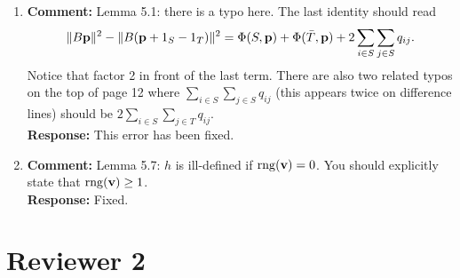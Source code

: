 \documentclass[a4paper,10pt]{article}
\begin{document}
\begin{enumerate}
\item\textbf{Comment:} 
Lemma 5.1: there is a typo here.  The last identity should read
\[
\|B\mathbf{p}\|^2 - \|B(\mathbf{p} + 1_S - 1_T)\|^2 = \Phi(S,\mathbf{p}) + \Phi(\bar{T}, \mathbf{p}) + 2\sum_{i \in S}\sum_{j\in S} q_{ij}.
\]
Notice that factor 2 in front of the last term.  There are also two related typos on the top of page 12 where $\sum_{i \in S}\sum_{j\in S} q_{ij}$ (this appears twice on difference lines) should be $2\sum_{i \in S}\sum_{j\in T} q_{ij}$.
\\\textbf{Response:}
This error has been fixed.


\item\textbf{Comment:} 
Lemma 5.7: $h$ is ill-defined if $\operatorname{rng}(\mathbf{v}) = 0$.  You should explicitly state that $\operatorname{rng}(\mathbf{v}) \geq 1$.
\\\textbf{Response:}
Fixed.


\end{enumerate}


\section*{Reviewer 2}\label{sec:reviewer-2}
\end{document}
